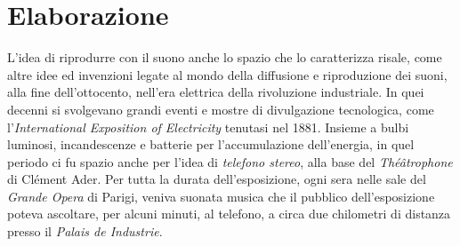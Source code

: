 \section{Elaborazione}

L'idea di riprodurre con il suono anche lo spazio che lo caratterizza risale,
come altre idee ed invenzioni legate al mondo della diffusione e riproduzione
dei suoni, alla fine dell'ottocento, nell'era elettrica della rivoluzione
industriale. In quei decenni si svolgevano grandi eventi e mostre di divulgazione
tecnologica, come l'\emph{International Exposition of Electricity} tenutasi nel 1881.
Insieme a bulbi luminosi, incandescenze e batterie per l'accumulazione
dell'energia, in quel periodo ci fu spazio anche per l'idea di \emph{telefono stereo},
alla base del \emph{Théâtrophone} di Clément Ader. Per tutta la durata
dell'esposizione, ogni sera nelle sale del \emph{Grande Opera} di Parigi, veniva
suonata musica che il pubblico dell'esposizione poteva ascoltare, per alcuni
minuti, al telefono, a circa due chilometri di distanza presso il
\emph{Palais de Industrie}.

